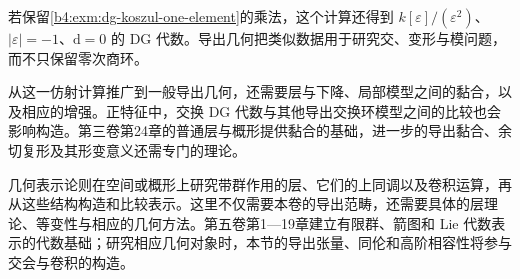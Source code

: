 \ProseParagraphBreak
若保留\cref{b4:exm:dg-koszul-one-element}的乘法，这个计算还得到 \(k[\varepsilon]/(\varepsilon^2)\)、\(|\varepsilon|=-1\)、\(\mathrm{d}=0\) 的 DG 代数。导出几何把类似数据用于研究交、变形与模问题，而不只保留零次商环。

\ProseParagraphBreak
从这一仿射计算推广到一般导出几何，还需要层与下降、局部模型之间的黏合，以及相应的增强。正特征中，交换 DG 代数与其他导出交换环模型之间的比较也会影响构造。第三卷第24章的普通层与概形提供黏合的基础，进一步的导出黏合、余切复形及其形变意义还需专门的理论。

\ProseParagraphBreak
几何表示论则在空间或概形上研究带群作用的层、它们的上同调以及卷积运算，再从这些结构构造和比较表示。这里不仅需要本卷的导出范畴，还需要具体的层理论、等变性与相应的几何方法。第五卷第1—19章建立有限群、箭图和 Lie 代数表示的代数基础；研究相应几何对象时，本节的导出张量、同伦和高阶相容性将参与交会与卷积的构造。

